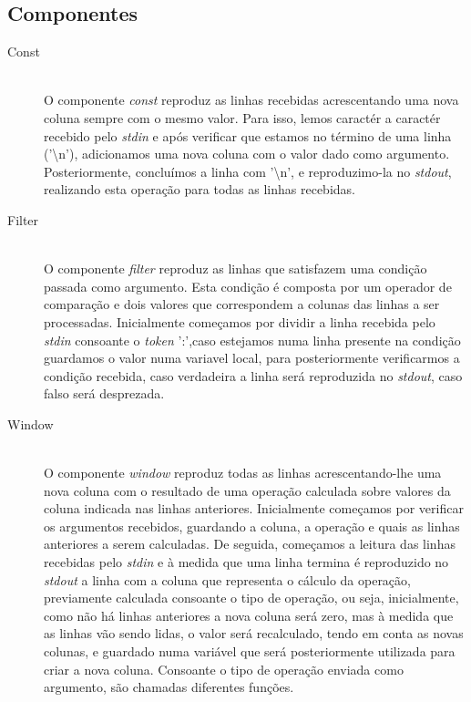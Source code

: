 \documentclass[12pt]{article}
\begin{document}
\newpage
\subsection{Componentes} 
\begin{description} 
\item[Const] \hfill \\
O componente \textit{const} reproduz as linhas recebidas acrescentando uma nova coluna sempre com o mesmo valor. Para isso, lemos caractér a caractér recebido pelo \textit{stdin} e após verificar que estamos no término de uma linha ('\textbackslash n'), adicionamos uma nova coluna com o valor dado como argumento. Posteriormente, concluímos a linha com '\textbackslash n', e reproduzimo-la no \textit{stdout}, realizando esta operação para todas as linhas recebidas. 

\item[Filter] \hfill \\
O componente \textit{filter} reproduz as linhas que satisfazem uma condição passada como argumento. Esta condição é composta por um operador de comparação e dois valores que correspondem a colunas das linhas a ser processadas. Inicialmente começamos por dividir a linha recebida pelo \textit{stdin} consoante o \textit{token} ':',caso estejamos numa linha presente na condição guardamos o valor numa variavel local, para posteriormente verificarmos a condição recebida, caso verdadeira a linha será reproduzida no \textit{stdout}, caso falso será desprezada.

\item[Window] \hfill \\
O componente \textit{window} reproduz todas as linhas acrescentando-lhe uma nova coluna com o resultado de uma operação calculada sobre valores da coluna indicada nas linhas anteriores. Inicialmente começamos por verificar os argumentos recebidos, guardando a coluna, a operação e quais as linhas anteriores a serem calculadas. De seguida, começamos a leitura das linhas recebidas pelo \textit{stdin} e à medida que uma linha termina é reproduzido no \textit{stdout} a linha com a coluna que representa o cálculo da operação, previamente calculada consoante o tipo de operação, ou seja, inicialmente, como não há linhas anteriores a nova coluna será zero, mas à medida que as linhas vão sendo lidas, o valor será recalculado, tendo em conta as novas colunas, e guardado numa variável que será posteriormente utilizada para criar a nova coluna. Consoante o tipo de operação enviada como argumento, são chamadas diferentes funções.


\end{description}
\end{document}
